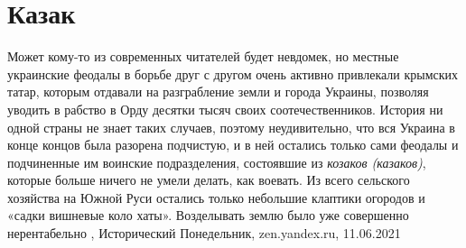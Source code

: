  
 
 
 
 
\chapter{Казак}

Может кому-то из современных читателей будет невдомек, но местные украинские
феодалы в борьбе друг с другом очень активно привлекали крымских татар, которым
отдавали на разграбление земли и города Украины, позволяя уводить в рабство в
Орду десятки тысяч своих соотечественников. История ни одной страны не знает
таких случаев, поэтому неудивительно, что вся Украина в конце концов была
разорена подчистую, и в ней остались только сами феодалы и подчиненные им
воинские подразделения, состоявшие из \emph{козаков (казаков)}, которые больше ничего
не умели делать, как воевать. Из всего сельского хозяйства на Южной Руси
остались только небольшие клаптики огородов и «садки вишневые коло хаты».
Возделывать землю было уже совершенно нерентабельно
, 
Исторический Понедельник, zen.yandex.ru, 11.06.2021
